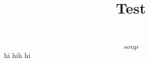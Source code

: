 \documentclass{article}
\title{
  Test
}
\begin{document}
\maketitle

\section{}

\begin{equation}
\label{eq:2}
  soup
\end{equation}
 hi hih hi
\end{document}
